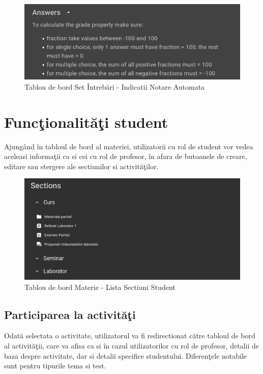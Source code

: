 \documentclass[12pt, a4paper, oneside, romanian]{teza-upb}
\begin{document}
\begin{figure}[H]
\centering
\includegraphics*[width=0.7\columnwidth]{tablou-de-bord-set-intrebari-indicatii-notare-automata}
\caption{Tablou de bord Set Întrebări - Indicatii Notare Automata}
\label{tablou-de-bord-set-intrebari-indicatii-notare-automata}
\end{figure}

\section{Funcţionalităţi student}

Ajungând în tabloul de bord al materiei, utilizatorii cu rol de student vor vedea aceleasi informaţii ca si cei cu rol de profesor, în afara de butoanele de creare, editare sau stergere ale sectiunilor si activităţilor.

\begin{figure}[H]
\centering
\includegraphics*[width=0.7\columnwidth]{tablou-de-bord-materie-lista-sectiuni-student}
\caption{Tablou de bord Materie - Lista Sectiuni Student}
\label{tablou-de-bord-materie-lista-sectiuni-student}
\end{figure}

\subsection{Participarea la activităţi}

Odată selectata o activitate, utilizatorul va fi redirectionat către tabloul de bord al activităţii, care va afisa ca si în cazul utilizatorilor cu rol de profesor, detalii de baza despre activitate, dar si detalii specifice studentului. Diferenţele notabile sunt pentru tipurile tema si test.
\end{document}
